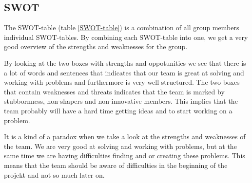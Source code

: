 \subsection{SWOT}

The SWOT-table (table \ref{SWOT-table}) is a combination of all group members individual SWOT-tables. By combining each SWOT-table into one, we get a very good overview of the strengths and weaknesses for the group.

By looking at the two boxes with strengths and oppotunities we see that there is a lot of words and sentences that indicates that our team is great at solving and working with problems and furthermore is very well structured.
The two boxes that contain weaknesses and threats indicates that the team is marked by stubbornness, non-shapers and non-innovative members. This implies that the team probably will have a hard time getting ideas and to start working on a problem. 

It is a kind of a paradox when we take a look at the strengths and weaknesses of the team. We are very good at solving and working with problems, but at the same time we are having difficulties finding and or creating these problems. This means that the team should be aware of difficulties in the beginning of the projekt and not so much later on.

